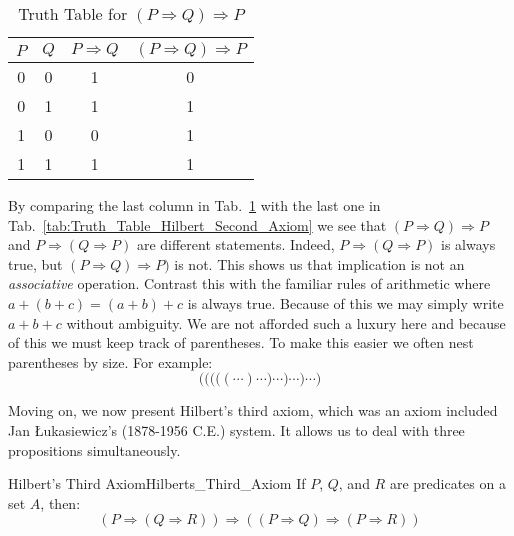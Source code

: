     \begin{table}
        \centering
        \captionsetup{type=table}
        \begin{tabular}{c|c|c|c}
            $P$&$Q$&$P\Rightarrow{Q}$&$(P\Rightarrow{Q})\Rightarrow{P}$\\
            \hline
            0&0&1&0\\
            0&1&1&1\\
            1&0&0&1\\
            1&1&1&1
        \end{tabular}
        \caption{Truth Table for $(P\Rightarrow{Q})\Rightarrow{P}$}
        \label{tab:Truth_Table_P_implies_Q_implies_P}
    \end{table}
    By comparing the last column in
    Tab.~\ref{tab:Truth_Table_P_implies_Q_implies_P} with the last one in
    Tab.~\ref{tab:Truth_Table_Hilbert_Second_Axiom} we see that
    $(P\Rightarrow{Q})\Rightarrow{P}$ and $P\Rightarrow(Q\Rightarrow{P})$ are
    different statements. Indeed, $P\Rightarrow(Q\Rightarrow{P})$ is always
    true, but $(P\Rightarrow{Q})\Rightarrow{P})$ is not. This shows us that
    implication is not an \textit{associative}
    operation. Contrast this with the familiar rules of arithmetic where
    $a+(b+c)=(a+b)+c$ is always true. Because of this we may simply write
    $a+b+c$ without ambiguity. We are not afforded such a luxury here and
    because of this we must keep track of parentheses. To make this easier we
    often nest parentheses by size. For example:
    \begin{equation}
        \Bigg(
            \bigg(
                \Big(
                    \big(
                        (\cdots)\cdots
                    \big)\cdots
                \Big)\cdots
            \bigg)\cdots
        \Bigg)
    \end{equation}
    \par\hfill\par
    Moving on, we now present Hilbert's third axiom, which was an axiom included
    Jan \L{u}kasiewicz's (1878-1956 C.E.) system. It
    allows us to deal with three propositions simultaneously.
    \begin{faxiom}{Hilbert's Third Axiom}{Hilberts_Third_Axiom}
        \label{thm:Lukasiewicz_Second_Axiom}%
        If $P$, $Q$, and $R$ are predicates on a set $A$, then:%
        \begin{equation*}
            (P\Rightarrow(Q\Rightarrow{R}))\Rightarrow
            ((P\Rightarrow{Q})\Rightarrow(P\Rightarrow{R}))
        \end{equation*}
    \end{faxiom}
